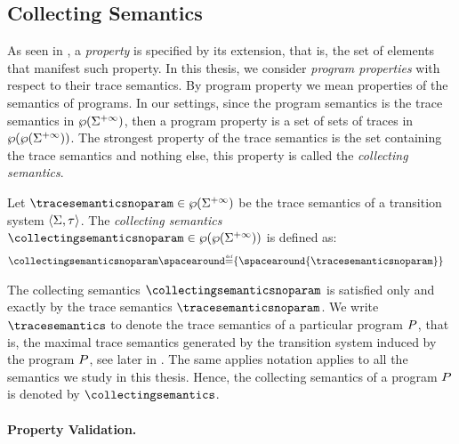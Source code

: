 \subsection{Collecting Semantics}

As seen in , a \emph{property} is specified by its extension, that is, the set of elements that manifest such property.
In this thesis, we consider \emph{program properties} with respect to their trace semantics.
By program property we mean properties of the semantics of programs.
In our settings, since the program semantics is the trace semantics in $\wp(\Sigma^{+\infty})$, then a program property is a set of sets of traces in $\wp(\wp(\Sigma^{+\infty}))$.
The strongest property of the trace semantics is the set containing the trace semantics and nothing else, this property is called the \emph{collecting semantics}.

\begin{definition}
  Let $\tracesemanticsnoparam\in\tracetype$ be the trace semantics of a transition system $\langle \Sigma, \tau \rangle$. The \emph{collecting semantics} $\collectingsemanticsnoparam\in\collectingtype$ is defined as:
  \begin{align*}
    \collectingsemanticsnoparam &\DefeQ \{\spacearound{\tracesemanticsnoparam}\}
  \end{align*}
\end{definition}

The collecting semantics $\collectingsemanticsnoparam$ is satisfied only and exactly by the trace semantics $\tracesemanticsnoparam$.
We write $\tracesemantics$ to denote the trace semantics of a particular program $P$, that is, the maximal trace semantics generated by the transition system induced by the program $P$, see later in .
The same applies notation applies to all the semantics we study in this thesis. Hence, the collecting semantics of a program $P$ is denoted by $\collectingsemantics$.

\paragraph{Property Validation.}

